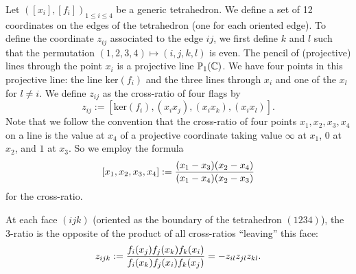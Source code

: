 Let $([x_i],[f_i])_{1\leq i \leq 4}$ be a generic tetrahedron.
 We define a set of 12 coordinates on the edges of the tetrahedron (one for each oriented edge).
To define the coordinate $z_{ij}$ associated to the edge $ij$, we first define $k$ and $l$ such that the permutation $(1,2,3,4) \mapsto (i,j,k,l)$ is even. The pencil of (projective) lines through the point $x_i$ is a projective line $\mathbb{P}_1(\mathbb{C})$. We have four points in this projective line: the line $\textrm{ker}(f_i)$ and the three lines through $x_i$ and one of the $x_l$ for $l\neq i$. We define $z_{ij}$ as the cross-ratio of four flags
by
$$z_{ij} := [\textrm{ker}(f_i),(x_ix_j),(x_ix_k),(x_ix_l)].$$
Note that we follow the convention that the cross-ratio of four points
$x_1, x_2 , x_3 , x_4$ on a line is the value at $x_4$ of a projective coordinate taking
value $\infty$ at $x_1$, $0$ at $x_2$, and $1$ at $x_3$. So we employ the formula
$$[x_1,x_2,x_3,x_4] :=\Frac{(x_1 -x_3)(x_2-x_4)}{(x_1 -x_4)(x_2-x_3)}$$ for the cross-ratio.

At each face $(ijk)$ (oriented as the boundary of the tetrahedron $(1234)$), the $3$-ratio is the opposite of the product of all cross-ratios ``leaving'' this face:
$$z_{ijk} := \Frac{f_i(x_j)f_j(x_k)f_k(x_i)}{f_i(x_k)f_j(x_i)f_k(x_j)}=- z_{il}z_{jl}z_{kl}.$$

